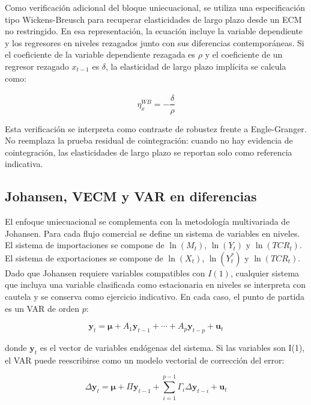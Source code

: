 \documentclass[11pt,a4paper]{article}
\begin{document}
	Como verificación adicional del bloque uniecuacional, se utiliza una
	especificación tipo Wickens-Breusch para recuperar elasticidades de largo plazo
	desde un ECM no restringido. En esa representación, la ecuación incluye la
	variable dependiente y los regresores en niveles rezagados junto con sus
	diferencias contemporáneas. Si el coeficiente de la variable dependiente
	rezagada es \(\rho\) y el coeficiente de un regresor rezagado \(x_{t-1}\) es
	\(\delta\), la elasticidad de largo plazo implícita se calcula como:

	\begin{equation}
		\eta_x^{WB} = -\frac{\widehat{\delta}}{\widehat{\rho}}
		\label{eq:wickens-breusch-elasticidad}
	\end{equation}

	Esta verificación se interpreta como contraste de robustez frente a
	Engle-Granger. No reemplaza la prueba residual de cointegración: cuando no hay
	evidencia de cointegración, las elasticidades de largo plazo se reportan solo
	como referencia indicativa.
	
	\subsection{Johansen, VECM y VAR en diferencias}
	\label{subsec:metodologia-johansen-var}
	
	El enfoque uniecuacional se complementa con la metodología multivariada de
	Johansen. Para cada flujo comercial se define un sistema de variables en
	niveles. El sistema de importaciones se compone de
	\(\ln(M_t)\), \(\ln(Y_t)\) y \(\ln(TCR_t)\). El sistema de exportaciones se
	compone de \(\ln(X_t)\), \(\ln(Y_t^*)\) y \(\ln(TCR_t)\). Dado que Johansen
	requiere variables compatibles con \(I(1)\), cualquier sistema que incluya una
	variable clasificada como estacionaria en niveles se interpreta con cautela y se
	conserva como ejercicio indicativo. En cada caso, el punto de partida es un VAR
	de orden \(p\):
	
	\begin{equation}
		\mathbf{y}_t
		= \boldsymbol{\mu}
		+ A_1\mathbf{y}_{t-1}
		+ \cdots
		+ A_p\mathbf{y}_{t-p}
		+ \mathbf{u}_t
		\label{eq:tp3-var-niveles}
	\end{equation}
	
	donde \(\mathbf{y}_t\) es el vector de variables endógenas del sistema. Si las
	variables son I(1), el VAR puede reescribirse como un modelo vectorial de
	corrección del error:
	
	\begin{equation}
		\Delta \mathbf{y}_t
		= \boldsymbol{\mu}
		+ \Pi \mathbf{y}_{t-1}
		+ \sum_{i=1}^{p-1}\Gamma_i \Delta \mathbf{y}_{t-i}
		+ \mathbf{u}_t
		\label{eq:tp3-vec-pi}
	\end{equation}
	
\end{document}
